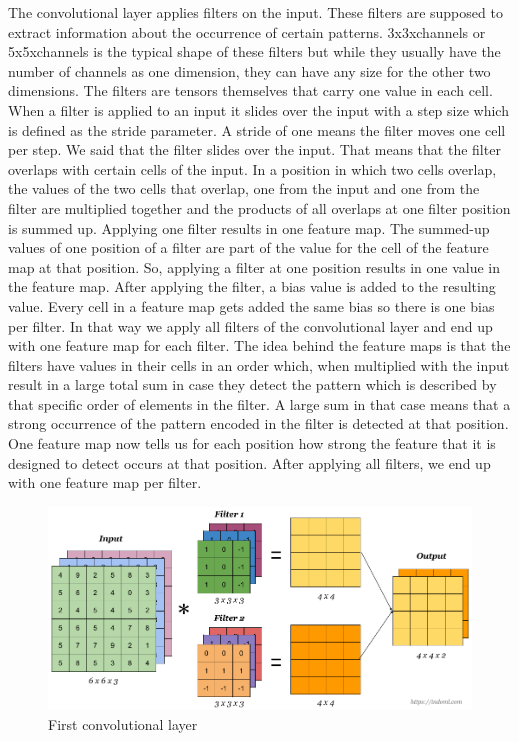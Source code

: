 \documentclass[a4paper,12pt]{report}
\begin{document}
The convolutional layer applies filters on the input. These filters are supposed to extract information about the occurrence of certain patterns. 3x3xchannels or 5x5xchannels is the typical shape of these filters but while they usually have the number of channels as one dimension, they can have any size for the other two dimensions. The filters are tensors themselves that carry one value in each cell. When a filter is applied to an input it slides over the input with a step size which is defined as the stride parameter. A stride of one means the filter moves one cell per step. We said that the filter slides over the input. That means that the filter overlaps with certain cells of the input. In a position in which two cells overlap, the values of the two cells that overlap, one from the input and one from the filter are multiplied together and the products of all overlaps at one filter position is summed up. Applying one filter results in one feature map. The summed-up values of one position of a filter are part of the value for the cell of the feature map at that position. So, applying a filter at one position results in one value in the feature map. After applying the filter, a bias value is added to the resulting value. Every cell in a feature map gets added the same bias so there is one bias per filter. In that way we apply all filters of the convolutional layer and end up with one feature map for each filter. The idea behind the feature maps is that the filters have values in their cells in an order which, when multiplied with the input result in a large total sum in case they detect the pattern which is described by that specific order of elements in the filter. A large sum in that case means that a strong occurrence of the pattern encoded in the filter is detected at that position. One feature map now tells us for each position how strong the feature that it is designed to detect occurs at that position. After applying all filters, we end up with one feature map per filter. \\

\begin{figure}[htbp]
  \centering
  \includegraphics[width=\textwidth]{images/CNN_filters.png}
  \caption{First convolutional layer}
  \label{fig:fullwidth}
\end{figure}
\end{document}
